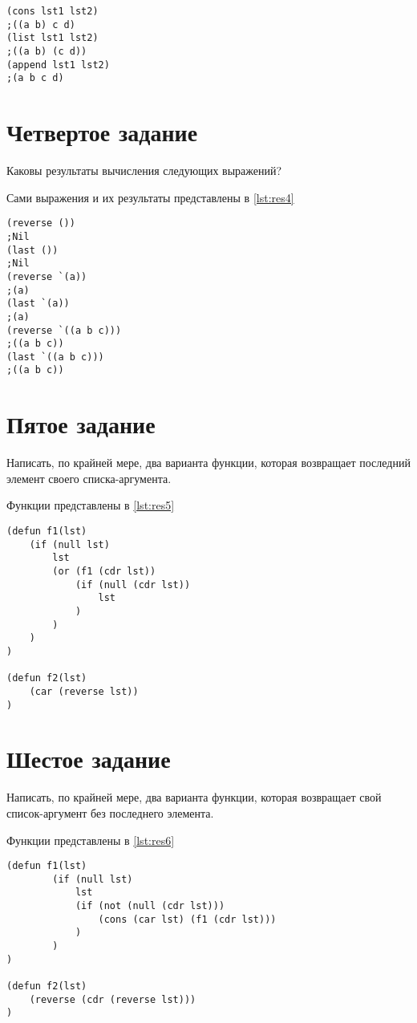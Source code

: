 \begin{lstlisting}[style=lispStyle, caption={ Выражения и их результата.},
                    label={lst:task3}]
(cons lst1 lst2)
;((a b) c d)
(list lst1 lst2)
;((a b) (c d))
(append lst1 lst2)
;(a b c d)
\end{lstlisting}

\section{ Четвертое задание}

Каковы результаты вычисления следующих выражений?

Сами выражения и их результаты представлены в \ref{lst:res4}

\begin{lstlisting}[style=lispStyle, caption={ Выражения и их результата.},
                    label={lst:res4}]
(reverse ())
;Nil
(last ())
;Nil
(reverse `(a))
;(a)
(last `(a))
;(a)
(reverse `((a b c)))
;((a b c))
(last `((a b c)))
;((a b c))
\end{lstlisting}

\section{ Пятое задание}

Написать, по крайней мере, два варианта функции, которая возвращает последний элемент своего списка-аргумента.

Функции представлены в \ref{lst:res5}

\begin{lstlisting}[style=lispStyle, caption={ Функции, возвращающие последний элемент списка},
                    label={lst:res5}]
(defun f1(lst)
    (if (null lst)
        lst
        (or (f1 (cdr lst))
            (if (null (cdr lst))
                lst
            )
        )
    )
)

(defun f2(lst)
    (car (reverse lst))
)
\end{lstlisting}

\section{ Шестое задание}

Написать, по крайней мере, два варианта функции, которая возвращает свой список-аргумент без последнего элемента.

Функции представлены в \ref{lst:res6}

\begin{lstlisting}[style=lispStyle, caption={ Функции, возвращающие список без последнего элемента},
                    label={lst:res6}]
(defun f1(lst)
        (if (null lst)
            lst
            (if (not (null (cdr lst)))
                (cons (car lst) (f1 (cdr lst)))
            )
        )
)

(defun f2(lst)
    (reverse (cdr (reverse lst)))
)
\end{lstlisting}

